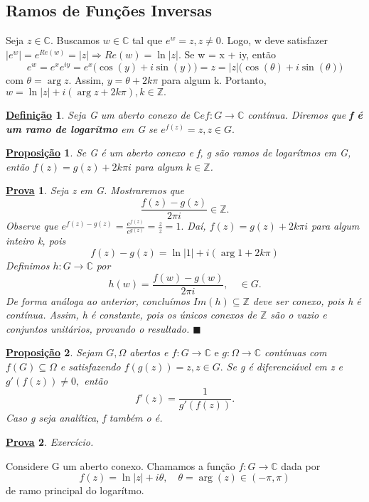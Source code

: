 \documentclass{article}
\newtheorem*{def*}{\underline{Defini\c c\~ao}}
\newtheorem*{proof*}{\underline{Prova}}
\newtheorem*{prop*}{\underline{Proposi\c c\~ao}}
\renewcommand\qedsymbol{$\blacksquare$}
\begin{document}
  \subsection{Ramos de Fun\c c\~oes Inversas}
  Seja $z\in \mathbb{C}.$ Buscamos $w\in \mathbb{C}$ tal que $e^{w} = z, z\neq0.$ Logo, w deve satisfazer $|e^{w}|
  = e^{Re(w)} = |z|\Rightarrow Re(w) = \ln{|z|}.$ Se w = x + iy, ent\~ao
  $$
  e^{w} = e^{x}e^{iy} = e^{x}\biggl(\cos{(y)} + i\sin{(y)}\biggr) = z = |z|\biggl(\cos{(\theta)} + i\sin{(\theta)}\biggr)
  $$
  com $\theta = \arg{z}.$ Assim, $y = \theta + 2k\pi$ para algum k. Portanto, $w = \ln{|z|} + i(\arg{z} + 2k\pi), k\in \mathbb{Z}.$
  \begin{def*}
    Seja G um aberto conexo de $\mathbb{C} e f:G\rightarrow \mathbb{C}$ cont\'inua. Diremos que \textbf{f \'e um ramo de logar\'itmo}
    em G se $e^{f(z)} = z, z\in{G}.$
  \end{def*}
  \begin{prop*}
    Se G \'e um aberto conexo e f, g s\~ao ramos de logar\'itmos em G, ent\~ao $f(z) = g(z) + 2k\pi i$ para algum
    $k\in \mathbb{Z}$.
  \end{prop*}
  \begin{proof*}
    Seja z em G. Mostraremos que 
    $$
    \frac{f(z) - g(z)}{2\pi i}\in \mathbb{Z}.
    $$
    Observe que $e^{f(z) - g(z)} = \frac{e^{f(z)}}{e^{g(z)}} = \frac{z}{z} = 1.$ Da\'i, $f(z) = g(z) + 2k\pi i$ para algum
    inteiro k, pois
    $$
    f(z) - g(z) = \ln{|1|} + i(\arg{1} + 2k\pi)
    $$
    Definimos $h:G\rightarrow \mathbb{C}$ por 
    $$
    h(w) = \frac{f(w) - g(w)}{2 \pi i}, \quad \in{G}.
    $$
    De forma an\'aloga ao anterior, conclu\'imos $Im(h)\subseteq{\mathbb{Z}}$ deve ser conexo, pois h \'e cont\'inua. Assim,
    h \'e constante, pois os \'unicos conexos de $\mathbb{Z}$ s\~ao o vazio e conjuntos unit\'arios, provando o resultado. \qedsymbol
  \end{proof*}
  \begin{prop*}
    Sejam $G, \Omega$ abertos e $f:G\rightarrow \mathbb{C}\text{ e }g:\Omega\rightarrow \mathbb{C}$ cont\'inuas com $f(G)\subseteq{\Omega}$
    e satisfazendo $f(g(z)) = z, z\in{G}.$ Se g \'e diferenci\'avel em z e $g'(f(z))\neq0,$ ent\~ao
    $$
    f'(z) = \frac{1}{g'(f(z))}.
    $$
    Caso g seja anal\'itica, f tamb\'em o \'e.
  \end{prop*}
  \begin{proof*}
    Exerc\'icio.
  \end{proof*}
  Considere G um aberto conexo. Chamamos a fun\c c\~ao $f:G\rightarrow \mathbb{C} $ dada por 
  $$
  f(z) = \ln{|z|} + i \theta, \quad \theta=\arg{(z)}\in{(-\pi, \pi)}
  $$
  de ramo principal do logar\'itmo.
  \newpage
\end{document}
